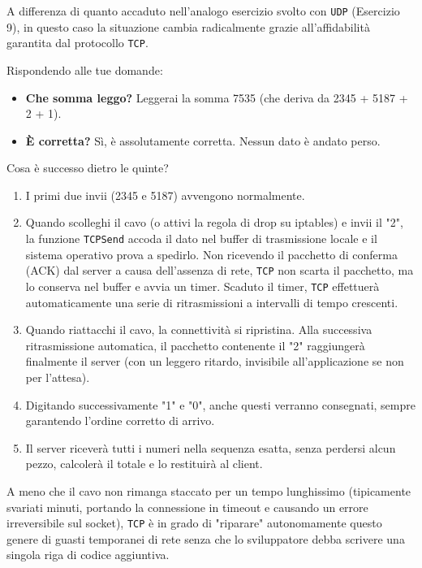 \documentclass[11pt]{article}
\begin{document}
\begin{tcolorbox}[colback=green!5!white,colframe=green!75!black,title=\textbf{RISPOSTA}, breakable]
A differenza di quanto accaduto nell'analogo esercizio svolto con \texttt{UDP} (Esercizio 9), in questo caso la situazione cambia radicalmente grazie all'affidabilità garantita dal protocollo \texttt{TCP}.

Rispondendo alle tue domande:

\begin{itemize}
    \item \textbf{Che somma leggo?} Leggerai la somma 7535 (che deriva da 2345 + 5187 + 2 + 1).
    \item \textbf{È corretta?} Sì, è assolutamente corretta. Nessun dato è andato perso.
\end{itemize}

Cosa è successo dietro le quinte?

\begin{enumerate}
    \item I primi due invii (2345 e 5187) avvengono normalmente.
    \item Quando scolleghi il cavo (o attivi la regola di drop su iptables) e invii il "2", la funzione \texttt{TCPSend} accoda il dato nel buffer di trasmissione locale e il sistema operativo prova a spedirlo. Non ricevendo il pacchetto di conferma (ACK) dal server a causa dell'assenza di rete, \texttt{TCP} non scarta il pacchetto, ma lo conserva nel buffer e avvia un timer. Scaduto il timer, \texttt{TCP} effettuerà automaticamente una serie di ritrasmissioni a intervalli di tempo crescenti.
    \item Quando riattacchi il cavo, la connettività si ripristina. Alla successiva ritrasmissione automatica, il pacchetto contenente il "2" raggiungerà finalmente il server (con un leggero ritardo, invisibile all'applicazione se non per l'attesa).
    \item Digitando successivamente "1" e "0", anche questi verranno consegnati, sempre garantendo l'ordine corretto di arrivo.
    \item Il server riceverà tutti i numeri nella sequenza esatta, senza perdersi alcun pezzo, calcolerà il totale e lo restituirà al client.
\end{enumerate}

A meno che il cavo non rimanga staccato per un tempo lunghissimo (tipicamente svariati minuti, portando la connessione in timeout e causando un errore irreversibile sul socket), \texttt{TCP} è in grado di "riparare" autonomamente questo genere di guasti temporanei di rete senza che lo sviluppatore debba scrivere una singola riga di codice aggiuntiva.
\end{tcolorbox}
\end{document}
